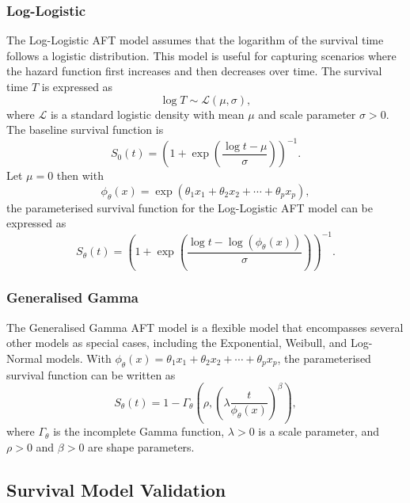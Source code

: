 
\subsubsection{Log-Logistic}
The Log-Logistic AFT model assumes that the logarithm of the survival time follows a logistic distribution. This model is useful for capturing scenarios where the hazard function first increases and then decreases over time. The survival time $T$ is expressed as
\[ %
    \log T \sim \mathcal{L}(\mu, \sigma),
\]
where $\mathcal{L}$ is a standard logistic density with mean $\mu$
and scale parameter $\sigma > 0$.  The baseline survival function is
\[ %
    S_0(t) = {\left(1 + \exp\left( \frac{\log t - \mu}{\sigma} \right)\right)} ^{-1}.
\]
Let $\mu=0$ then with
\[
    \phi_\theta(x) = \exp(\theta_1 x_1 + \theta_2 x_2 + \cdots + \theta_p x_p),
\]
the parameterised survival function for the Log-Logistic AFT model can be expressed as
\[ %
    S_{\theta}(t) = {\left( 1 + \exp \left( \frac{\log t - \log(\phi_\theta(x))}{\sigma}\right) \right)}^{-1}.
\]


\subsubsection{Generalised Gamma}
The Generalised Gamma AFT model is a flexible model that encompasses several other models as special cases, including the Exponential, Weibull, and Log-Normal models.
With $\phi_{\theta}(x) = \theta_1 x_1 + \theta_2 x_2 + \cdots + \theta_p x_p$, the parameterised survival function can be written as
\[
    S_{\theta}(t) = 1 - \Gamma_{\theta}\left(\rho, {\left(\lambda \frac{t}{\phi_\theta(x)}\right)}^\beta\right),
\]
where $\Gamma_{\theta}$ is the incomplete Gamma function, $\lambda > 0$ is a scale parameter, and $\rho>0$ and $\beta > 0$ are shape parameters.



\subsection{Survival Model Validation}
\label{metrics}

